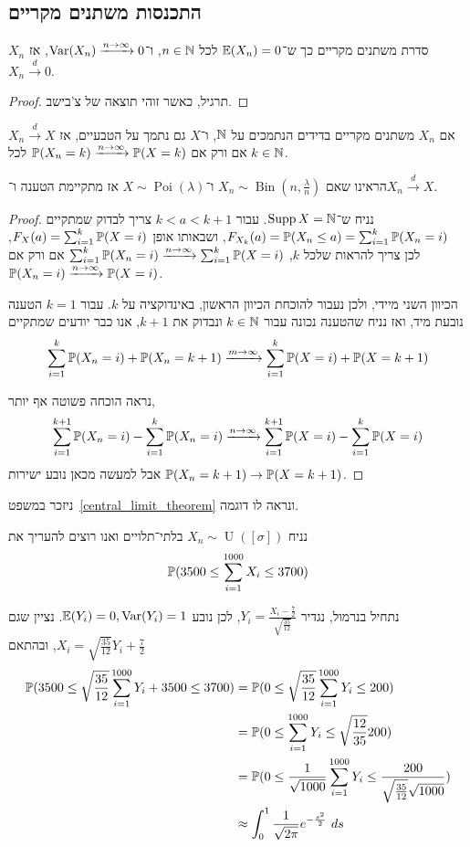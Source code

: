 \subsection{התכנסות משתנים מקריים}
\begin{proposition}
	$X_n$ סדרת משתנים מקריים כך ש־$\mathbb{E}(X_n) = 0$ לכל $n \in \mathbb{N}$, ו־$\operatorname{Var}(X_n) \xrightarrow{n \to \infty} 0$, אז $X_n \xrightarrow{d} 0$.
\end{proposition}
\begin{proof}
	תרגיל, כאשר זוהי תוצאה של צ'בישב.
\end{proof}
\begin{proposition}
	אם $X_n$ משתנים מקריים בדידים הנתמכים על $\mathbb{N}$, ו־$X$ גם נתמך על הטבעיים,
	אז $X_n \xrightarrow{d} X$ אם ורק אם $\mathbb{P}(X_n = k) \xrightarrow{n \to \infty} \mathbb{P}(X = k)$ לכל $k \in \mathbb{N}$.
\end{proposition}
הראינו שאם $X_n \sim \operatorname{Bin}(n, \frac{\lambda}{n})$ ו־$X \sim \operatorname{Poi}(\lambda)$ אז מתקיימת הטענה ו־$X_n \xrightarrow{d} X$.
\begin{proof}
	נניח ש־$\operatorname{Supp} X = \mathbb{N}$.
	עבור $k < a < k + 1$ צריך לבדוק שמתקיים $F_{X_k}(a) = \mathbb{P}(X_n \le a) = \sum_{i = 1}^{k} \mathbb{P}(X_n = i)$,
	ושבאותו אופן $F_X(a) = \sum_{i = 1}^{k} \mathbb{P}(X = i)$, לכן צריך להראות שלכל $k$,
	$\sum_{i = 1}^{k} \mathbb{P}(X_n = i) \xrightarrow{n \to \infty} \sum_{i = 1}^{k} \mathbb{P}(X = i)$ אם ורק אם $\mathbb{P}(X_n = i) \xrightarrow{n \to \infty} \mathbb{P}(X = i)$.

	הכיוון השני מיידי, ולכן נעבור להוכחת הכיוון הראשון, באינדוקציה על $k$.
	עבור $k = 1$ הטענה נובעת מיד, ואז נניח שהטענה נכונה עבור $k \in \mathbb{N}$ ונבדוק את $k + 1$,
	אנו כבר יודעים שמתקיים
	\[
		\sum_{i = 1}^{k} \mathbb{P}(X_n = i) + \mathbb{P}(X_n = k + 1)
		\xrightarrow{m \to \infty} \sum_{i = 1}^{k} \mathbb{P}(X = i) + \mathbb{P}(X = k + 1)
	\]

	נראה הוכחה פשוטה אף יותר,
	\[
		\sum_{i = 1}^{k + 1} \mathbb{P}(X_n = i) - \sum_{i = 1}^{k} \mathbb{P}(X_n = i)
		\xrightarrow{n \to \infty}
		\sum_{i = 1}^{k + 1} \mathbb{P}(X = i) - \sum_{i = 1}^{k} \mathbb{P}(X = i)
	\]
	אבל למעשה מכאן נובע ישירות $\mathbb{P}(X_n = k + 1) \to \mathbb{P}(X = k + 1)$.
\end{proof}
ניזכר במשפט\ \ref{central_limit_theorem} ונראה לו דוגמה.
\begin{example}
	נניח $X_n \sim \operatorname{U}([\sigma])$ בלתי־תלויים ואנו רוצים להעריך את
	\[
		\mathbb{P}(3500 \le \sum_{i = 1}^{1000} X_i \le 3700)
	\]

	נתחיל בנרמול, נגדיר $Y_i = \frac{X_i - \frac{7}{2}}{\sqrt{\frac{35}{12}}}$, לכן נובע $\mathbb{E}(Y_i) = 0, \operatorname{Var}(Y_i) = 1$.
	נציין שגם $X_i = \sqrt{\frac{35}{12}} Y_i + \frac{7}{2}$, ובהתאם
	\begin{align*}
		\mathbb{P}(3500 \le \sqrt{\frac{35}{12}} \sum_{i = 1}^{1000} Y_i + 3500 \le 3700)
		& = \mathbb{P}(0 \le \sqrt{\frac{35}{12}} \sum_{i = 1}^{1000} Y_i \le 200) \\
		& = \mathbb{P}(0 \le \sum_{i = 1}^{1000} Y_i \le \sqrt{\frac{12}{35}} 200) \\
		& = \mathbb{P}(0 \le \frac{1}{\sqrt{1000}} \sum_{i = 1}^{1000} Y_i \le \frac{200}{\sqrt{\frac{35}{12}} \sqrt{1000}}) \\
		& \approx \int_0^1 \frac{1}{\sqrt{2 \pi}} e^{-\frac{s^2}{2}}\ ds
	\end{align*}
\end{example}
